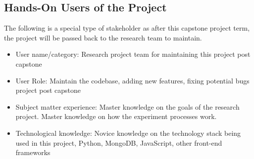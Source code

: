 \documentclass[12pt]{article}
\begin{document}
\subsection{Hands-On Users of the Project}
The following is a special type of stakeholder as after this capstone project
term, the project will be passed back to the research team to maintain. 
\begin{itemize}
  \item User name/category: Research project team for maintaining this project post capstone 
  \item User Role: Maintain the codebase, adding new features, fixing potential bugs
  project post capstone
  \item Subject matter experience: Master knowledge on the goals of the research
  project. Master knowledge on how the experiment processes work. 
  \item Technological knowledge: Novice knowledge on the technology stack being
  used in this project, Python, MongoDB, JavaScript, other front-end frameworks 
\end{itemize}
\end{document}
